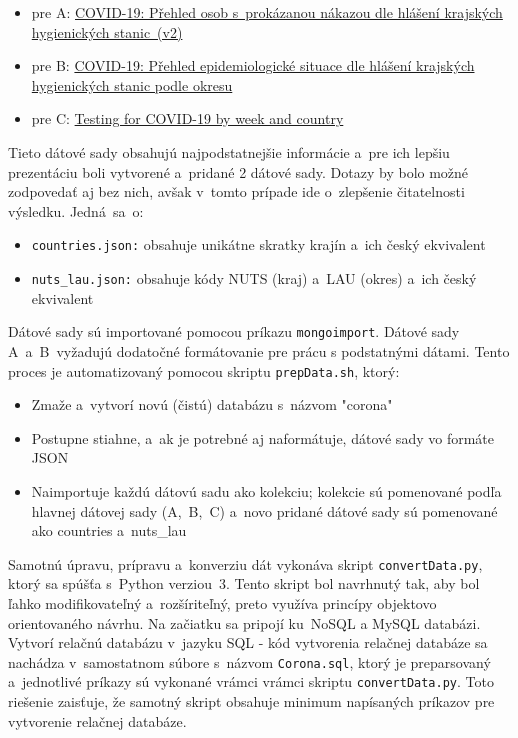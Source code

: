 \documentclass [11pt, a4paper]{article}
\begin{document}
\begin{itemize}
\item pre A: \href{https://onemocneni-aktualne.mzcr.cz/api/v2/covid-19/osoby.min.json }{COVID-19: Přehled osob s~prokázanou nákazou dle hlášení krajských hygienických stanic~(v2)}
\item pre B: \href{https://onemocneni-aktualne.mzcr.cz/api/v2/covid-19/kraj-okres-nakazeni-vyleceni-umrti.min.json}{COVID-19: Přehled epidemiologické situace dle hlášení krajských hygienických stanic podle okresu}
\item pre C: \href{https://www.ecdc.europa.eu/en/publications-data/covid-19-testing}{Testing for COVID-19 by week and country}
\end{itemize}

Tieto dátové sady obsahujú najpodstatnejšie informácie a~pre ich lepšiu prezentáciu boli vytvorené a~pridané 2 dátové sady. Dotazy by bolo možné zodpovedať aj bez nich, avšak v~tomto prípade ide o~zlepšenie čitatelnosti výsledku. Jedná~sa~o:
\begin{itemize}
\item \texttt{countries.json:} obsahuje unikátne skratky krajín a~ich český ekvivalent
\item \texttt{nuts\_lau.json:} obsahuje kódy NUTS (kraj) a~LAU (okres) a~ich český ekvivalent
\end{itemize} 

Dátové sady sú importované pomocou príkazu \texttt{mongoimport}. Dátové sady A~a~B~vyžadujú dodatočné formátovanie pre prácu s podstatnými dátami. Tento proces je automatizovaný pomocou skriptu \texttt{prepData.sh}, ktorý:
\begin{itemize}
\item Zmaže a~vytvorí novú (čistú) databázu s~názvom "corona"
\item Postupne stiahne, a~ak je potrebné aj naformátuje, dátové sady vo formáte JSON
\item Naimportuje každú dátovú sadu ako kolekciu; kolekcie sú pomenované podľa hlavnej dátovej sady (A,~B,~C) a~novo pridané dátové sady sú pomenované ako countries a~nuts\_lau
\end{itemize}

Samotnú úpravu, prípravu a~konverziu dát vykonáva skript \texttt{convertData.py}, ktorý sa spúšťa s~Python verziou~3. Tento skript bol navrhnutý tak, aby bol ľahko modifikovateľný a~rozšíriteľný, preto využíva princípy objektovo orientovaného návrhu. Na začiatku sa pripojí ku~NoSQL a MySQL databázi. Vytvorí relačnú databázu v~jazyku SQL - kód vytvorenia relačnej databáze sa nachádza v~samostatnom súbore s~názvom \texttt{Corona.sql}, ktorý je preparsovaný a~jednotlivé príkazy sú vykonané vrámci vrámci skriptu \texttt{convertData.py}. Toto riešenie zaisťuje, že samotný skript obsahuje minimum  napísaných príkazov pre vytvorenie relačnej databáze.
\end{document}
